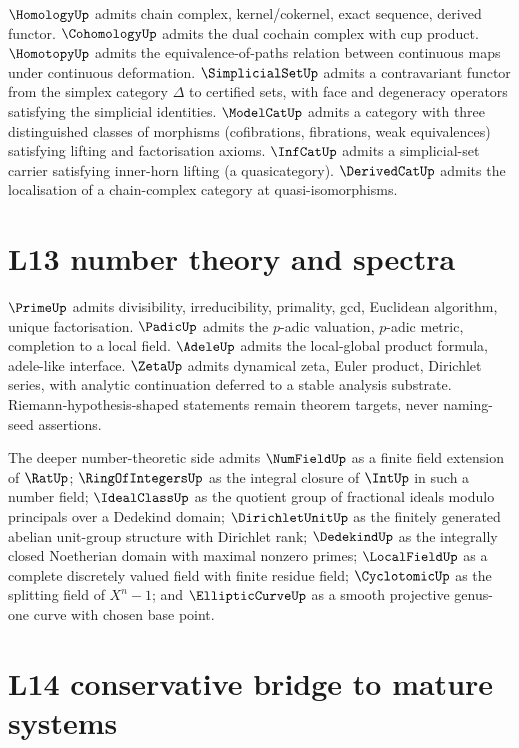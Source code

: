 $\HomologyUp$ admits chain complex, kernel/cokernel, exact sequence, derived functor. $\CohomologyUp$ admits the dual cochain complex with cup product. $\HomotopyUp$ admits the equivalence-of-paths relation between continuous maps under continuous deformation. $\SimplicialSetUp$ admits a contravariant functor from the simplex category $\Delta$ to certified sets, with face and degeneracy operators satisfying the simplicial identities. $\ModelCatUp$ admits a category with three distinguished classes of morphisms (cofibrations, fibrations, weak equivalences) satisfying lifting and factorisation axioms. $\InfCatUp$ admits a simplicial-set carrier satisfying inner-horn lifting (a quasicategory). $\DerivedCatUp$ admits the localisation of a chain-complex category at quasi-isomorphisms.

\section{L13 number theory and spectra}
\label{sec:roadmap-l13-number-theory-spectra}

$\PrimeUp$ admits divisibility, irreducibility, primality, gcd, Euclidean algorithm, unique factorisation. $\PadicUp$ admits the $p$-adic valuation, $p$-adic metric, completion to a local field. $\AdeleUp$ admits the local-global product formula, adele-like interface. $\ZetaUp$ admits dynamical zeta, Euler product, Dirichlet series, with analytic continuation deferred to a stable analysis substrate. Riemann-hypothesis-shaped statements remain theorem targets, never naming-seed assertions.

The deeper number-theoretic side admits $\NumFieldUp$ as a finite field extension of $\RatUp$; $\RingOfIntegersUp$ as the integral closure of $\IntUp$ in such a number field; $\IdealClassUp$ as the quotient group of fractional ideals modulo principals over a Dedekind domain; $\DirichletUnitUp$ as the finitely generated abelian unit-group structure with Dirichlet rank; $\DedekindUp$ as the integrally closed Noetherian domain with maximal nonzero primes; $\LocalFieldUp$ as a complete discretely valued field with finite residue field; $\CyclotomicUp$ as the splitting field of $X^n - 1$; and $\EllipticCurveUp$ as a smooth projective genus-one curve with chosen base point.

\section{L14 conservative bridge to mature systems}
\label{sec:roadmap-l14-bridge}


